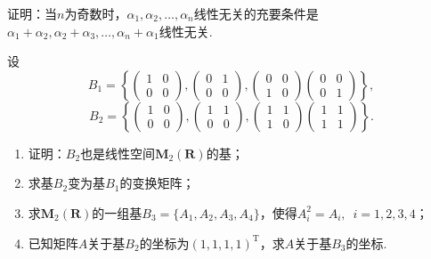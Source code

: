 \begin{exercise}
\begin{exgroup}
        \item 证明：当$n$为奇数时，$\alpha_1,\alpha_2,\ldots,\alpha_n$线性无关的充要条件是$\alpha_1+\alpha_2,\alpha_2+\alpha_3,\ldots,\alpha_n+\alpha_1$线性无关.

        \item 设
        \[B_1=\left\{\begin{pmatrix}
                1 & 0 \\ 0 & 0
            \end{pmatrix},\begin{pmatrix}
                0 & 1 \\ 0 & 0
            \end{pmatrix},\begin{pmatrix}
                0 & 0 \\ 1 & 0
            \end{pmatrix}\begin{pmatrix}
                0 & 0 \\ 0 & 1
            \end{pmatrix}\right\},\]
        \[B_2=\left\{\begin{pmatrix}
                1 & 0 \\ 0 & 0
            \end{pmatrix},\begin{pmatrix}
                1 & 1 \\ 0 & 0
            \end{pmatrix},\begin{pmatrix}
                1 & 1 \\ 1 & 0
            \end{pmatrix}\begin{pmatrix}
                1 & 1 \\ 1 & 1
            \end{pmatrix}\right\}.\]
        \begin{enumerate}
            \item 证明：$B_2$也是线性空间$\mathbf{M}_2(\mathbf{R})$的基；

            \item 求基$B_2$变为基$B_1$的变换矩阵；

            \item 求$\mathbf{M}_2(\mathbf{R})$的一组基$B_3=\{A_1,A_2,A_3,A_4\}$，使得$A_i^2=A_i,\enspace i=1,2,3,4$；

            \item 已知矩阵$A$关于基$B_2$的坐标为$(1,1,1,1)^\mathrm{T}$，求$A$关于基$B_3$的坐标.
        \end{enumerate}


\end{exgroup}
\end{exercise}
